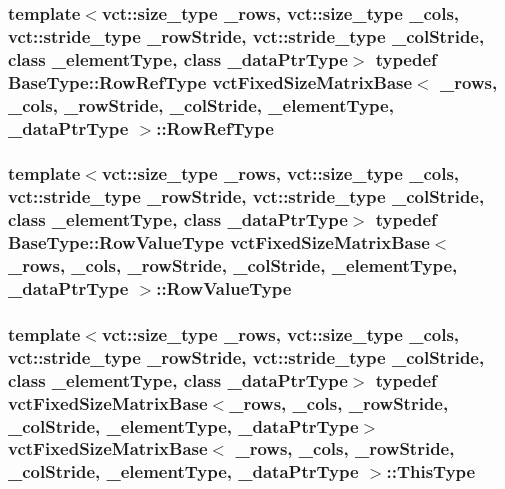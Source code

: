 \hypertarget{classvct_fixed_size_matrix_base_a99d07082e6588c81902cf19226ebf93b}{
\subsubsection[{Row\-Ref\-Type}]{\setlength{\rightskip}{0pt plus 5cm}template$<$vct\-::size\-\_\-type \-\_\-rows, vct\-::size\-\_\-type \-\_\-cols, vct\-::stride\-\_\-type \-\_\-row\-Stride, vct\-::stride\-\_\-type \-\_\-col\-Stride, class \-\_\-element\-Type, class \-\_\-data\-Ptr\-Type$>$ typedef {\bf Base\-Type\-::\-Row\-Ref\-Type} {\bf vct\-Fixed\-Size\-Matrix\-Base}$<$ \-\_\-rows, \-\_\-cols, \-\_\-row\-Stride, \-\_\-col\-Stride, \-\_\-element\-Type, \-\_\-data\-Ptr\-Type $>$\-::{\bf Row\-Ref\-Type}}}\label{classvct_fixed_size_matrix_base_a99d07082e6588c81902cf19226ebf93b}
\hypertarget{classvct_fixed_size_matrix_base_a63ea40ab7299ff1f714ba077ef1fe568}{
\subsubsection[{Row\-Value\-Type}]{\setlength{\rightskip}{0pt plus 5cm}template$<$vct\-::size\-\_\-type \-\_\-rows, vct\-::size\-\_\-type \-\_\-cols, vct\-::stride\-\_\-type \-\_\-row\-Stride, vct\-::stride\-\_\-type \-\_\-col\-Stride, class \-\_\-element\-Type, class \-\_\-data\-Ptr\-Type$>$ typedef {\bf Base\-Type\-::\-Row\-Value\-Type} {\bf vct\-Fixed\-Size\-Matrix\-Base}$<$ \-\_\-rows, \-\_\-cols, \-\_\-row\-Stride, \-\_\-col\-Stride, \-\_\-element\-Type, \-\_\-data\-Ptr\-Type $>$\-::{\bf Row\-Value\-Type}}}\label{classvct_fixed_size_matrix_base_a63ea40ab7299ff1f714ba077ef1fe568}
\hypertarget{classvct_fixed_size_matrix_base_ad2d0e739023eaf4fe1a77106083eec76}{
\subsubsection[{This\-Type}]{\setlength{\rightskip}{0pt plus 5cm}template$<$vct\-::size\-\_\-type \-\_\-rows, vct\-::size\-\_\-type \-\_\-cols, vct\-::stride\-\_\-type \-\_\-row\-Stride, vct\-::stride\-\_\-type \-\_\-col\-Stride, class \-\_\-element\-Type, class \-\_\-data\-Ptr\-Type$>$ typedef {\bf vct\-Fixed\-Size\-Matrix\-Base}$<$\-\_\-rows, \-\_\-cols, \-\_\-row\-Stride, \-\_\-col\-Stride, \-\_\-element\-Type, \-\_\-data\-Ptr\-Type$>$ {\bf vct\-Fixed\-Size\-Matrix\-Base}$<$ \-\_\-rows, \-\_\-cols, \-\_\-row\-Stride, \-\_\-col\-Stride, \-\_\-element\-Type, \-\_\-data\-Ptr\-Type $>$\-::{\bf This\-Type}}}\label{classvct_fixed_size_matrix_base_ad2d0e739023eaf4fe1a77106083eec76}


